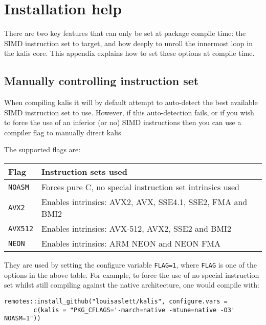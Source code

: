 \documentclass[a4paper]{article}
\newcommand{\pkg}[1]{{\fontseries{m}\fontseries{b}\selectfont #1}}
\begin{document}
\section{Installation help}
\label{installation-help}

There are two key features that can only be set at package compile time: the SIMD instruction set to target, and how deeply to unroll the innermost loop in the \pkg{kalis} core.
This appendix explains how to set these options at compile time.



\subsection{Manually controlling instruction set}
\label{apx:compileis}

When compiling \pkg{kalis} it will by default attempt to auto-detect the best available SIMD instruction set to use.
However, if this auto-detection fails, or if you wish to force the use of an inferior (or no) SIMD instructions then you can use a compiler flag to manually direct \pkg{kalis}.

The supported flags are:

\begin{longtable}{ll}
	\toprule
	\textbf{Flag} & \textbf{Instruction sets used} \\
	\midrule
	\texttt{NOASM} & Forces pure C, no special instruction set intrinsics used \\
	\texttt{AVX2} & Enables intrinsics: AVX2, AVX, SSE4.1, SSE2, FMA and BMI2 \\
	\texttt{AVX512} & Enables intrinsics: AVX-512, AVX2, SSE2 and BMI2 \\
	\texttt{NEON} & Enables intrinsics: ARM NEON and NEON FMA \\
	\bottomrule
\end{longtable}

They are used by setting the configure variable \texttt{FLAG=1}, where \texttt{FLAG} is one of the options in the above table.
For example, to force the use of no special instruction set whilst still compiling against the native architecture, one would compile with:

\begin{verbatim}
remotes::install_github("louisaslett/kalis", configure.vars =
        c(kalis = "PKG_CFLAGS='-march=native -mtune=native -O3' NOASM=1"))
\end{verbatim}
\end{document}

